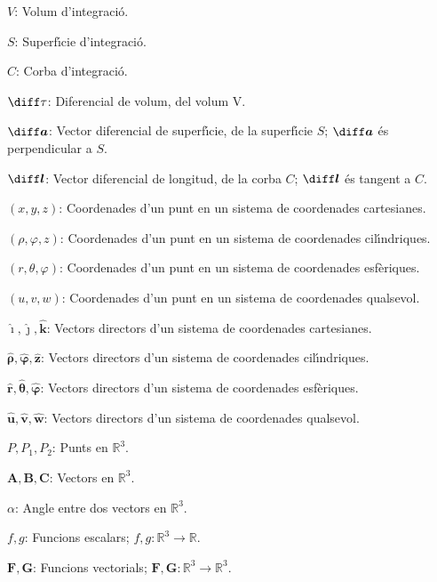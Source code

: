 \documentclass[catalan,a4paper,twoside,11pt]{article}
\begin{document}
\begin{list}{}
{\setlength{\labelwidth}{16mm}
\setlength{\leftmargin}{18mm}\setlength{\labelsep}{2mm}}
   \item[$V$:] Volum d'integraci\'{o}.
   \item[$S$:] Superf\'{\i}cie d'integraci\'{o}.
   \item[$C$:] Corba d'integraci\'{o}.
   \item[$\diff\tau$:] Diferencial de volum, del volum V.
   \item[$\boldsymbol{\diff a}$:] Vector diferencial de superf\'{\i}cie, de la superf\'{\i}cie
   $S$; $\boldsymbol{\diff a}$ \'{e}s perpendicular a $S$.
   \item[$\boldsymbol{\diff l}$:] Vector diferencial de longitud, de la corba
   $C$; $\boldsymbol{\diff l}$ \'{e}s tangent a $C$.
   \item[$(x,y,z)$:] Coordenades d'un punt en un sistema de
   coordenades cartesianes.
   \item[$(\rho,\varphi,z)$:] Coordenades d'un punt en un sistema de
   coordenades cil\'{\i}ndriques.
   \item[$(r,\theta,\varphi)$:] Coordenades d'un punt en un sistema de
   coordenades esf\`{e}riques.
   \item[$(u,v,w)$:] Coordenades d'un punt en un sistema de
   coordenades qualsevol.
   \item[$\boldsymbol{\hat{\imath}},\boldsymbol{\hat{\jmath}},\boldsymbol{\hat{k}}$:]
   Vectors directors d'un sistema de  coordenades
   cartesianes.
   \item[$\boldsymbol{\hat{\rho}},\boldsymbol{\hat{\varphi}},\boldsymbol{\hat{z}}$:] Vectors directors d'un sistema de
   coordenades cil\'{\i}ndriques.
   \item[$\boldsymbol{\hat{r}},\boldsymbol{\hat{\theta}},\boldsymbol{\hat{\varphi}}$:] Vectors directors d'un sistema de
   coordenades esf\`{e}riques.
   \item[$\boldsymbol{\hat{u}},\boldsymbol{\hat{v}},\boldsymbol{\hat{w}}$:]
   Vectors directors d'un sistema de  coordenades
   qualsevol.
   \item[$P,P_1,P_2$:] Punts en $\mathbb{R}^3$.
   \item[$\boldsymbol{A,B,C}$:] Vectors en $\mathbb{R}^3$.
   \item[$\alpha$:] Angle entre dos vectors en $\mathbb{R}^3$.
   \item[$f,g$:] Funcions escalars; $f,g: \mathbb{R}^3\rightarrow\mathbb{R}$.
   \item[$\boldsymbol{F,G}$:] Funcions vectorials; $\boldsymbol{F,G}:\mathbb{R}^3\rightarrow\mathbb{R}^3$.

\end{list}
\end{document}

